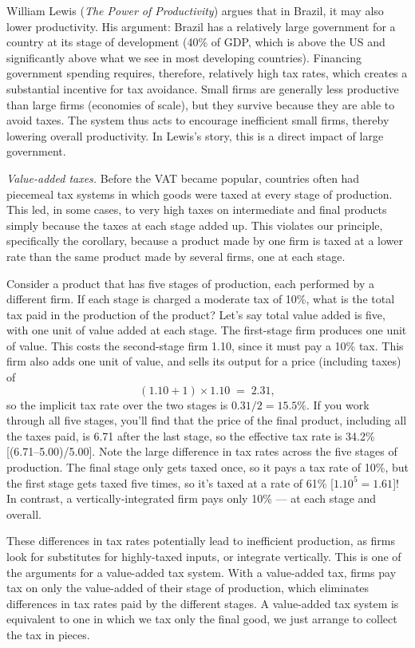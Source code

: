 \documentclass[letterpaper,12pt]{article}
\begin{document}
William Lewis ({\it The Power of Productivity\/}) argues that in
Brazil, it may also lower productivity.
His argument:  Brazil has a relatively large government
for a country at its stage of development (40\% of GDP, which
is above the US
and significantly above what we see in most developing countries).
Financing government spending requires, therefore,
relatively high tax rates,
which creates a substantial incentive for tax avoidance.
Small firms are generally less productive than large firms
(economies of scale),
but they survive because they are able to avoid taxes.
The system thus acts to encourage inefficient small firms,
thereby lowering overall productivity.
In Lewis's story, this is a direct impact of large government.


{\it Value-added taxes.}
Before the VAT became popular, countries often had piecemeal
tax systems in which goods were taxed at every stage
of production.
This led, in some cases,
to very high taxes on intermediate and final products
simply because the taxes at each stage added up.
This violates our principle, specifically the corollary,
because a product made by one firm is taxed
at a lower rate than the same product made by several firms,
one at each stage.

Consider a product that has five stages of production,
each performed by a different firm.
If each stage is charged a moderate tax of 10\%,
what is the total tax paid in the production
of the product?
Let's say total value added is five, with one
unit of value added at each stage.
The first-stage firm produces one unit of value.
This costs the second-stage firm 1.10,
since it must pay a 10\% tax.
This firm also adds one unit of value,
and sells its output for a price (including taxes) of
\[
    \left( 1.10 + 1 \right) \times 1.10 \;=\; 2.31,
\]
so the implicit tax rate over the two stages is
$ 0.31/2 = 15.5\%$.
If you work through all five stages,
you'll find that the price of the final product,
including all the taxes paid,
is 6.71 after the last stage, so the effective tax rate is 34.2\%
[(6.71--5.00)/5.00].
Note the large difference
in tax rates across the five stages of production.
The final stage only gets taxed once, so it pays a tax rate of 10\%,
but the first stage gets taxed five times, so
it's taxed at a rate of 61\% [$1.10^5 = 1.61$]!
In contrast, a vertically-integrated firm pays only 10\% ---
at each stage and overall.

These differences in tax rates potentially lead to
inefficient production,
as firms look for substitutes for highly-taxed inputs,
or integrate vertically.
This is one of the arguments for a value-added tax system.
With a value-added tax, firms pay tax on only the value-added of their
stage of production, which eliminates differences in tax rates
paid by the different stages.
A value-added tax system is equivalent to one
in which we tax only the final good,
we just arrange to collect the tax in pieces.
\end{document}

